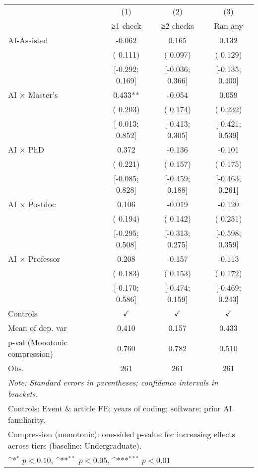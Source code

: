 \def\sym#1{\ifmmode^{#1}\else\(^{#1}\)\fi}
\begin{tabular}{l*{3}{c}}
\hline\hline
 & (1) & (2) & (3)
\\
 & ≥1 check & ≥2 checks & Ran any
 \\
\hline
AI-Assisted & -0.062 &  0.165 &  0.132
\\
 & ( 0.111) & ( 0.097) & ( 0.129)
\\
 & [-0.292;  0.169] & [-0.036;  0.366] & [-0.135;  0.400]
\\
AI × Master's &  0.433** & -0.054 &  0.059
\\
 & ( 0.203) & ( 0.174) & ( 0.232)
\\
 & [ 0.013;  0.852] & [-0.413;  0.305] & [-0.421;  0.539]
\\
AI × PhD &  0.372 & -0.136 & -0.101
\\
 & ( 0.221) & ( 0.157) & ( 0.175)
\\
 & [-0.085;  0.828] & [-0.459;  0.188] & [-0.463;  0.261]
\\
AI × Postdoc &  0.106 & -0.019 & -0.120
\\
 & ( 0.194) & ( 0.142) & ( 0.231)
\\
 & [-0.295;  0.508] & [-0.313;  0.275] & [-0.598;  0.359]
\\
AI × Professor &  0.208 & -0.157 & -0.113
\\
 & ( 0.183) & ( 0.153) & ( 0.172)
\\
 & [-0.170;  0.586] & [-0.474;  0.159] & [-0.469;  0.243]
\\
\hline
Controls & $\checkmark$ & $\checkmark$ & $\checkmark$
\\
Mean of dep. var &  0.410 &  0.157 &  0.433
\\
p-val (Monotonic compression) &  0.760 &  0.782 &  0.510
\\
Obs. & 261 & 261 & 261
\\
\hline
\hline\hline
\multicolumn{4}{l}{\it{Note:} Standard errors in parentheses; confidence intervals in brackets.}\\
\multicolumn{4}{l}{Controls: Event \& article FE; years of coding; software; prior AI familiarity.}\\
\multicolumn{4}{l}{Compression (monotonic): one-sided p-value for increasing effects across tiers (baseline: Undergraduate).}\\
\multicolumn{4}{l}{\sym{*} $p<0.10$, \sym{**} $p<0.05$,  \sym{***} $p<0.01$}\\
\end{tabular}
